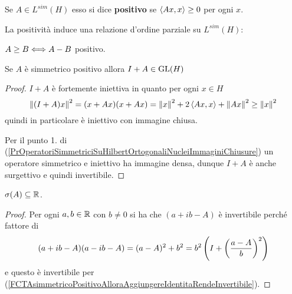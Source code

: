 \begin{definition}
Se $A\in L^{sim}(H)$ esso si dice \textbf{positivo} se $\left\langle {Ax,x}\right\rangle\geq 0$ per ogni $x$.
\end{definition}
\begin{remark}
La positivit\`a induce una relazione d'ordine parziale su $L^{sim}(H)$: 
\begin{center}
    $A\geq B\Longleftrightarrow A-B$ positivo.
\end{center}
\end{remark}

\begin{fact}[]\label{FCTAsimmetricoPositivoAlloraAggiungereIdentitaRendeInvertibile}
Se $A$ \`e simmetrico positivo allora $I+A\in \mathrm{GL}(H)$
\end{fact}
\begin{proof}
$I+A$ \`e fortemente iniettiva in quanto per ogni $x\in H$
\[\left\Vert{(I+A)x}\right\Vert^2=(x+Ax)(x+Ax)=\left\Vert{x}\right\Vert^2+2\left\langle {Ax,x}\right\rangle+\left\Vert{Ax}\right\Vert^2\geq \left\Vert{x}\right\Vert^2\]
quindi in particolare \`e iniettivo con immagine chiusa.

Per il punto 1. di (\ref{PrOperatoriSimmetriciSuHilbertOrtogonaliNucleiImmaginiChiusure}) un operatore simmetrico e iniettivo ha immagine densa, dunque $I+A$ \`e anche surgettivo e quindi invertibile.
\end{proof}


\begin{proposition}[]\label{PrSpettroOperatoreSimmetricoEReale}
$\sigma(A)\subseteq \mathbb{R}$.
\end{proposition}
\begin{proof}
Per ogni $a,b\in\mathbb{R}$ con $b\neq 0$ si ha che $(a+ib-A)$ \`e invertibile perch\'e fattore di
\[(a+ib-A)(a-ib -A)=(a-A)^2+b^2=b^2\left({I+\left({\frac{a-A}b}\right)^2}\right)\]
e questo \`e invertibile per (\ref{FCTAsimmetricoPositivoAlloraAggiungereIdentitaRendeInvertibile}).
\end{proof}







